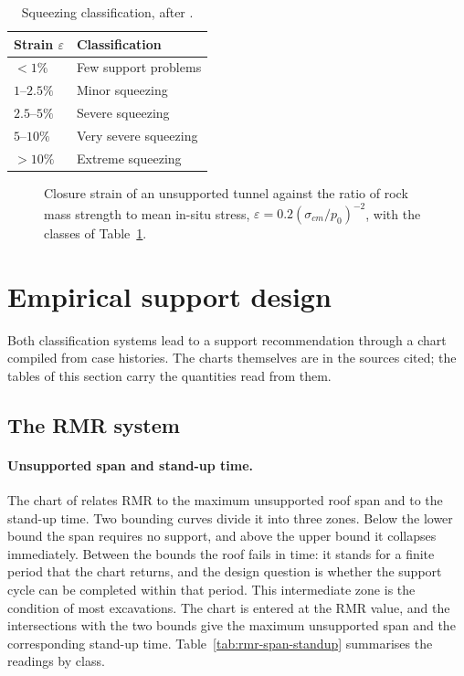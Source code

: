 \begin{table}[htbp]
\caption{Squeezing classification, after \citet{hoekmarinos2000squeezing}.}
\label{tab:squeezing-classification}
\centering
\small
\begin{tabular}{ll}
\toprule
\textbf{Strain $\varepsilon$} & \textbf{Classification} \\
\midrule
$<1\%$ & Few support problems \\
$1$--$2.5\%$ & Minor squeezing \\
$2.5$--$5\%$ & Severe squeezing \\
$5$--$10\%$ & Very severe squeezing \\
$>10\%$ & Extreme squeezing \\
\bottomrule
\end{tabular}
\end{table}

\begin{figure}[htbp]
\centering
{}
\caption{Closure strain of an unsupported tunnel against the ratio of rock mass strength to mean in-situ stress, $\varepsilon = 0.2(\sigma_{cm}/p_0)^{-2}$, with the classes of Table~\ref{tab:squeezing-classification}.}
\label{fig:squeezing-strain}
\end{figure}


\section{Empirical support design}
\label{sec:empirical-support-design}

Both classification systems lead to a support recommendation through a chart
compiled from case histories. The charts themselves are in the sources
cited; the tables of this section carry the quantities read from them.

\subsection{The RMR system}
\label{sec:rmr-support-design}

\paragraph{Unsupported span and stand-up time.}
The chart of \citet{bieniawski1989rmr} relates RMR to the maximum
unsupported roof span and to the stand-up time. Two bounding curves divide it
into three zones. Below the lower bound the span requires no support, and
above the upper bound it collapses immediately. Between the bounds the roof
fails in time: it stands for a finite period that the chart returns, and the
design question is whether the support cycle can be completed within that
period. This intermediate zone is the condition of most excavations. The
chart is entered at the RMR value, and the intersections with the two bounds
give the maximum unsupported span and the corresponding stand-up time.
Table~\ref{tab:rmr-span-standup} summarises the readings by class.


